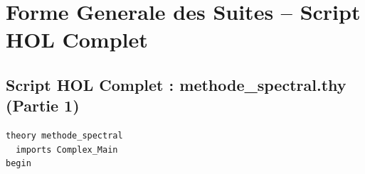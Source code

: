 \documentclass[a4paper,11pt]{article}
\begin{document}
\newpage
\section{Forme Generale des Suites -- Script HOL Complet}

\subsection{Script HOL Complet : methode\_spectral.thy (Partie 1)}

\begin{holcode}[title={\textcolor{white}{Fichier : methode\_spectral.thy -- Partie 1/4}}]
\begin{lstlisting}
theory methode_spectral
  imports Complex_Main
begin


\end{lstlisting}
\end{holcode}
\end{document}
